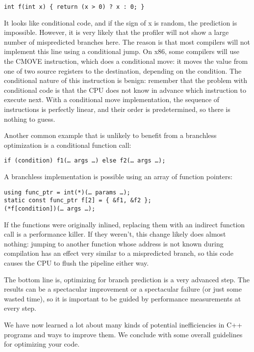 \begin{lstlisting}[style=styleCXX]
int f(int x) { return (x > 0) ? x : 0; }
\end{lstlisting}

It looks like conditional code, and if the sign of x is random, the prediction is impossible. However, it is very likely that the profiler will not show a large number of mispredicted branches here. The reason is that most compilers will not implement this line using a conditional jump. On x86, some compilers will use the CMOVE instruction, which does a conditional move: it moves the value from one of two source registers to the destination, depending on the condition. The conditional nature of this instruction is benign: remember that the problem with conditional code is that the CPU does not know in advance which instruction to execute next. With a conditional move implementation, the sequence of instructions is perfectly linear, and their order is predetermined, so there is nothing to guess. 

Another common example that is unlikely to benefit from a branchless optimization is a conditional function call:

\begin{lstlisting}[style=styleCXX]
if (condition) f1(… args …) else f2(… args …);
\end{lstlisting}

A branchless implementation is possible using an array of function pointers:

\begin{lstlisting}[style=styleCXX]
using func_ptr = int(*)(… params …);
static const func_ptr f[2] = { &f1, &f2 };
(*f[condition])(… args …);
\end{lstlisting}

If the functions were originally inlined, replacing them with an indirect function call is a performance killer. If they weren’t, this change likely does almost nothing: jumping to another function whose address is not known during compilation has an effect very similar to a mispredicted branch, so this code causes the CPU to flush the pipeline either way. 

The bottom line is, optimizing for branch prediction is a very advanced step. The results can be a spectacular improvement or a spectacular failure (or just some wasted time), so it is important to be guided by performance measurements at every step.

We have now learned a lot about many kinds of potential inefficiencies in C++ programs and ways to improve them. We conclude with some overall guidelines for optimizing your code.



